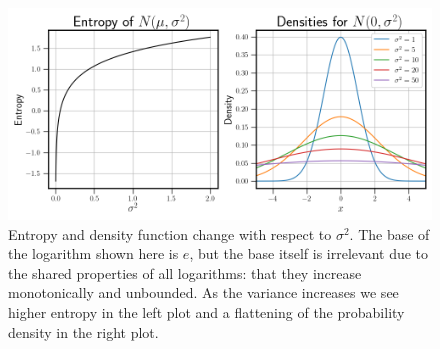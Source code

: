 \begin{figure}[ht]
    \centering
    \includegraphics[width=\textwidth]{../Figures/entropy_densities_example.png}

    \caption{Entropy and density function change with respect to $\sigma^2$. The base 
    of the logarithm shown here is $e$, but the base itself is irrelevant due to the shared
    properties of all logarithms: that they increase monotonically and unbounded. As the 
    variance increases we see higher entropy in the left plot and a flattening of the 
    probability density in the right plot.}
    \label{fig:entropy example}
\end{figure}


